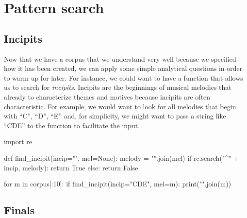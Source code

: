 \documentclass[
  a4paperpaper,
  ,captions=tableheading
]{scrbook}
\newenvironment{Shaded}{\begin{snugshade}}{\end{snugshade}}
\newcommand{\BuiltInTok}[1]{\textcolor[rgb]{0.00,0.23,0.31}{#1}}
\newcommand{\ControlFlowTok}[1]{\textcolor[rgb]{0.00,0.23,0.31}{#1}}
\newcommand{\DecValTok}[1]{\textcolor[rgb]{0.68,0.00,0.00}{#1}}
\newcommand{\ImportTok}[1]{\textcolor[rgb]{0.00,0.46,0.62}{#1}}
\newcommand{\KeywordTok}[1]{\textcolor[rgb]{0.00,0.23,0.31}{#1}}
\newcommand{\NormalTok}[1]{\textcolor[rgb]{0.00,0.23,0.31}{#1}}
\newcommand{\OperatorTok}[1]{\textcolor[rgb]{0.37,0.37,0.37}{#1}}
\newcommand{\StringTok}[1]{\textcolor[rgb]{0.13,0.47,0.30}{#1}}
\newcommand{\VariableTok}[1]{\textcolor[rgb]{0.07,0.07,0.07}{#1}}
\begin{document}
\hypertarget{pattern-search}{%
\section{Pattern search}\label{pattern-search}}

\hypertarget{incipits}{%
\subsection{Incipits}\label{incipits}}

Now that we have a corpus that we understand very well because we
specified how it has been created, we can apply some simple analytical
questions in order to warm up for later. For instance, we could want to
have a function that allows us to search for \emph{incipits}. Incipits
are the beginnings of musical melodies that already to characterize
themes and motives because incipits are often characteristic. For
example, we would want to look for all melodies that begin with ``C'',
``D'', ``E'' and, for simplicity, we might want to pass a string like
``CDE'' to the function to facilitate the input.

\begin{Shaded}
\begin{Highlighting}[]
\ImportTok{import}\NormalTok{ re }

\KeywordTok{def}\NormalTok{ find\_incipit(incip}\OperatorTok{=}\StringTok{""}\NormalTok{, mel}\OperatorTok{=}\VariableTok{None}\NormalTok{):}
\NormalTok{    melody }\OperatorTok{=} \StringTok{""}\NormalTok{.join(mel)}
    \ControlFlowTok{if}\NormalTok{ re.search(}\StringTok{"\^{}"} \OperatorTok{+}\NormalTok{ incip, melody):}
        \ControlFlowTok{return} \VariableTok{True}
    \ControlFlowTok{else}\NormalTok{:}
        \ControlFlowTok{return} \VariableTok{False}

\ControlFlowTok{for}\NormalTok{ m }\KeywordTok{in}\NormalTok{ corpus[:}\DecValTok{10}\NormalTok{]:}
    \ControlFlowTok{if}\NormalTok{ find\_incipit(incip}\OperatorTok{=}\StringTok{"CDE"}\NormalTok{, mel}\OperatorTok{=}\NormalTok{m):}
        \BuiltInTok{print}\NormalTok{(}\StringTok{""}\NormalTok{.join(m))}
\end{Highlighting}
\end{Shaded}

\hypertarget{finals}{%
\subsection{Finals}\label{finals}}
\end{document}
